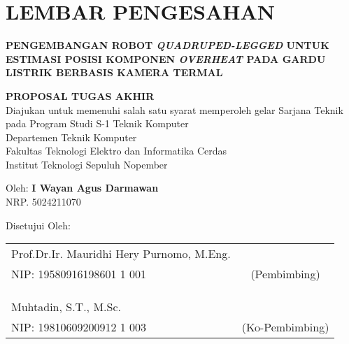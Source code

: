 \chapter*{LEMBAR PENGESAHAN}

\thispagestyle{empty}

\begin{center}
  \textbf{PENGEMBANGAN ROBOT \emph{QUADRUPED-LEGGED} UNTUK ESTIMASI POSISI KOMPONEN \emph{OVERHEAT} PADA GARDU LISTRIK BERBASIS KAMERA TERMAL}
\end{center}

\begingroup
\small

\begin{center}
  \textbf{PROPOSAL TUGAS AKHIR} \\
  Diajukan untuk memenuhi salah satu syarat memperoleh gelar
  Sarjana Teknik pada
  Program Studi S-1 Teknik Komputer \\
  Departemen Teknik  Komputer \\
  Fakultas Teknologi Elektro dan Informatika Cerdas \\
  Institut Teknologi Sepuluh Nopember
\end{center}

\begin{center}
  Oleh: \textbf{I Wayan Agus Darmawan} \\
  NRP. 5024211070
\end{center}

\begin{center}
  Disetujui Oleh:
\end{center}

\vspace{10ex}

\begingroup
\setlength{\tabcolsep}{0pt}

\noindent
\begin{tabularx}{\textwidth}{X c}
  Prof.Dr.Ir. Mauridhi Hery Purnomo, M.Eng.  &   \\
  NIP: 19580916198601 1 001    & (Pembimbing)    \\
                                &                 \\
                                &                 \\
                                &                 \\
  Muhtadin, S.T., M.Sc.         &                 \\
  NIP: 19810609200912 1 003    & (Ko-Pembimbing)    \\
\end{tabularx}
\endgroup

